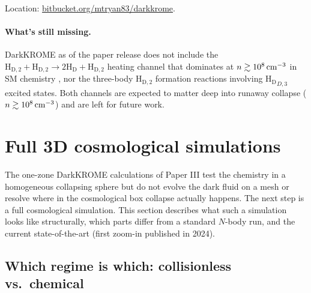 \documentclass[12pt]{article}
\newcommand{\HD}{\mathrm{H_D}}
\newcommand{\HDtwo}{\mathrm{H_{D,2}}}
\begin{document}
Location:
\href{https://bitbucket.org/mtryan83/darkkrome}{bitbucket.org/mtryan83/darkkrome}.

\paragraph{What's still missing.}
DarkKROME as of the paper release does not include the
$\HDtwo + \HDtwo \to 2\HD + \HDtwo$ heating channel that dominates at
$n \gtrsim 10^8\,{\rm cm^{-3}}$ in SM chemistry \citep{GalliPalla1998},
nor the three-body $\HDtwo$ formation reactions involving $\HD_{D,3}$
excited states.  Both channels are expected to matter deep into
runaway collapse ($n \gtrsim 10^8\,{\rm cm^{-3}}$) and are left for
future work.

\section{Full 3D cosmological simulations}
\label{sec:sims}

The one-zone DarkKROME calculations of Paper III test the chemistry in
a homogeneous collapsing sphere but do not evolve the dark fluid on a
mesh or resolve where in the cosmological box collapse actually
happens.  The next step is a full cosmological simulation.  This
section describes what such a simulation looks like structurally,
which parts differ from a standard $N$-body run, and the current
state-of-the-art (first zoom-in published in 2024).

\subsection{Which regime is which: collisionless vs.\ chemical}
\label{sec:regime_map}
\end{document}

